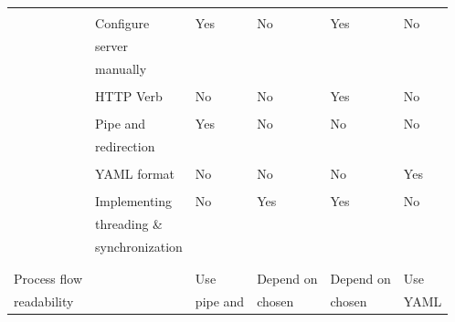 \documentclass[conference]{IEEEtran}
\begin{document}
\begin{table}[]
\begin{tabular}{@{}llllll@{}}
             &                 &               &               &               &               \\
             & Configure       & Yes           & No            & Yes           & No            \\
             & server          &               &               &               &               \\
             & manually        &               &               &               &               \\
             &                 &               &               &               &               \\
             & HTTP Verb       & No            & No            & Yes           & No            \\
             &                 &               &               &               &               \\
             & Pipe and        & Yes           & No            & No            & No            \\
             & redirection     &               &               &               &               \\
             &                 &               &               &               &               \\
             & YAML format     & No            & No            & No            & Yes           \\
             &                 &               &               &               &               \\
             & Implementing    & No            & Yes           & Yes           & No            \\
             & threading \&    &               &               &               &               \\
             & synchronization &               &               &               &               \\
             &                 &               &               &               &               \\
             &                 &               &               &               &               \\ \midrule
Process flow &                 & Use           & Depend on     & Depend on     & Use           \\
readability  &                 & pipe and      & chosen        & chosen        & YAML          \\

\end{tabular}
\end{table}
\end{document}

